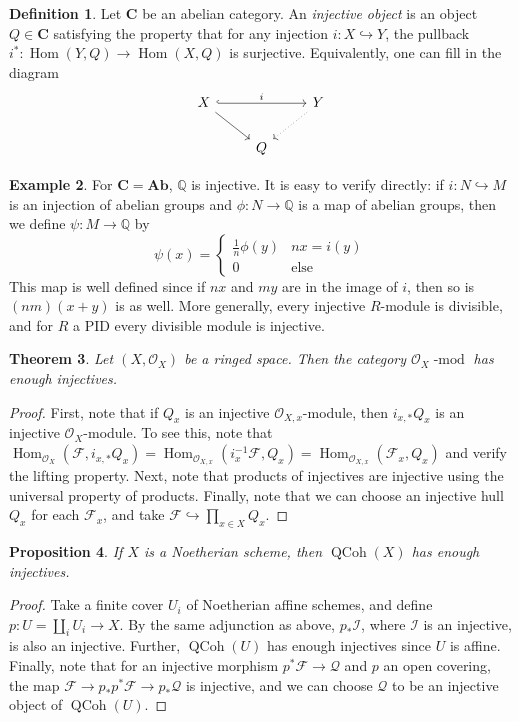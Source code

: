 \documentclass[10pt]{article}
\newtheorem{thm}{Theorem}[section]
\newtheorem{prop}[thm]{Proposition}
\theoremstyle{definition}
\newtheorem{exmp}[thm]{Example}
\newtheorem{defn}[thm]{Definition}
\DeclareMathOperator{\Hom}{Hom}
\DeclareMathOperator{\dmod}{-mod}
\DeclareMathOperator{\QCoh}{QCoh}
\newcommand{\cat}{\mathbf}
\newcommand{\Q}{\mathbb{Q}}
\newcommand{\OO}{\mathcal{O}}
\begin{document}
\begin{defn}
Let $\cat{C}$ be an abelian category.  An \emph{injective object} is an object $Q \in \cat{C}$ satisfying the property that for any injection $i: X \hookrightarrow Y$, the pullback $i^*: \Hom(Y, Q) \rightarrow \Hom(X, Q)$ is surjective.  Equivalently, one can fill in the diagram
$$\begin{tikzcd}
X \arrow[rr, hook, "i"] \arrow[dr] & & Y \arrow[dl, dotted] \\ 
& Q & 
\end{tikzcd}$$
\end{defn}

\begin{exmp}
For $\cat{C} = \cat{Ab}$, $\Q$ is injective.  It is easy to verify directly: if $i: N \hookrightarrow M$ is an injection of abelian groups and $\phi: N \rightarrow \Q$ is a map of abelian groups, then we define $\psi: M \rightarrow \Q$ by
$$\psi(x) = \begin{cases}  \frac 1 n \phi(y) & nx = i(y) \\ 0 & \mathrm{else} \end{cases}$$
This map is well defined since if $nx$ and $my$ are in the image of $i$, then so is $(nm)(x+y)$ is as well.  More generally, every injective $R$-module is divisible, and for $R$ a PID every divisible module is injective.
\end{exmp}


\begin{thm}
Let $(X, \OO_X)$ be a ringed space.  Then the category $\OO_X\dmod$ has enough injectives.
\end{thm}
\begin{proof}
First, note that if $Q_x$ is an injective $\OO_{X, x}$-module, then $i_{x,*}Q_x$ is an injective $\OO_X$-module.  To see this, note that $\Hom_{\OO_X}(\mathcal{F}, i_{x,*}Q_x) = \Hom_{\OO_{X, x}}(i_x^{-1} \mathcal{F}, Q_x) = \Hom_{\OO_{X, x}}(\mathcal{F}_x, Q_x)$ and verify the lifting property.  Next, note that products of injectives are injective using the universal property of products.  Finally, note that we can choose an injective hull $Q_x$ for each $\mathcal{F}_x$, and take $\mathcal{F} \hookrightarrow \prod_{x \in X} Q_x$.
\end{proof}

\begin{prop}
If $X$ is a Noetherian scheme, then $\QCoh(X)$ has enough injectives.
\end{prop}
\begin{proof}
Take a finite cover $U_i$ of Noetherian affine schemes, and define $p: U = \coprod_i U_i \rightarrow X$.  By the same adjunction as above, $p_* \mathcal{I}$, where $\mathcal{I}$ is an injective, is also an injective.  Further, $\QCoh(U)$ has enough injectives since $U$ is affine.  Finally, note that for an injective morphism $p^*\mathcal{F} \rightarrow \mathcal{Q}$ and $p$ an open covering, the map $\mathcal{F} \rightarrow p_* p^* \mathcal{F} \rightarrow p_* \mathcal{Q}$ is injective, and we can choose $\mathcal{Q}$ to be an injective object of $\QCoh(U)$.
\end{proof}
\end{document}
